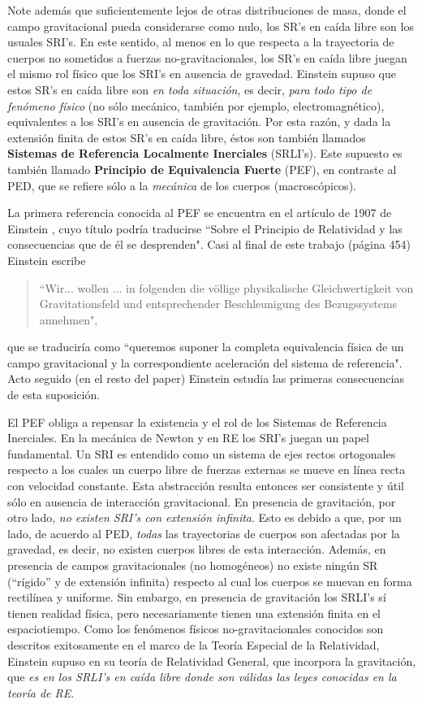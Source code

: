 Note además que suficientemente lejos de otras distribuciones de masa, donde el campo gravitacional pueda considerarse como nulo, los SR's en caída libre son los usuales SRI's. En este sentido, al menos en lo que respecta a la trayectoria de cuerpos no sometidos a fuerzas no-gravitacionales, los SR's en caída libre juegan el mismo rol físico que los SRI's en ausencia de gravedad. Einstein supuso que estos SR's en caída libre son \textit{en toda situación}, es decir, \textit{para todo tipo de fenómeno físico} (no sólo mecánico, también por ejemplo, electromagnético), equivalentes a los SRI's en ausencia de gravitación. Por esta razón, y dada la extensión finita de estos SR's en caída libre, éstos son también llamados \textbf{Sistemas de Referencia Localmente Inerciales} (SRLI's). Este supuesto es también llamado \textbf{Principio de Equivalencia Fuerte} (PEF), en contraste al PED, que se refiere sólo a la \emph{mecánica} de los cuerpos (macroscópicos).

La primera referencia conocida al PEF se encuentra en el artículo de 1907 de Einstein \cite{Einstein07}, cuyo título podría traducirse ``Sobre el Principio de Relatividad y las consecuencias que de él se desprenden".
 Casi al final de este trabajo (página 454) Einstein escribe 
\begin{quotation}
``Wir... wollen ... in folgenden die v\"ollige physikalische Gleichwertigkeit von Gravitationsfeld und entsprechender Beschleunigung des Bezugssystems annehmen",
\end{quotation}
que se traduciría como ``queremos suponer la completa equivalencia física de un campo gravitacional y la correspondiente aceleración del sistema de referencia". Acto seguido (en el resto del paper) Einstein estudia las primeras consecuencias de esta suposición.
 
El PEF obliga a repensar la existencia y el rol de los Sistemas de Referencia Inerciales. En la mecánica de Newton y en RE los SRI's juegan un papel fundamental. Un SRI es entendido como un sistema de ejes rectos ortogonales respecto a los cuales un cuerpo libre de fuerzas externas se mueve en línea recta con velocidad constante. Esta abstracción resulta entonces ser consistente y útil sólo en ausencia de interacción gravitacional. En presencia de gravitación, por otro lado, \textit{no existen SRI's con extensión infinita}. Esto es debido a que, por un lado, de acuerdo al PED, \textit{todas} las trayectorias de cuerpos son afectadas por la gravedad, es decir, no existen cuerpos libres de esta interacción. Además, en presencia de campos gravitacionales (no homogéneos) no existe ningún SR (``rígido'' y de extensión infinita) respecto al cual los cuerpos se muevan en forma rectilínea y uniforme.
Sin embargo, en presencia de gravitación los SRLI's sí tienen realidad física, pero necesariamente tienen una extensión finita en el espaciotiempo.
Como los fenómenos físicos no-gravitacionales conocidos son descritos exitosamente en el marco de la Teoría Especial de la Relatividad, Einstein supuso en su teoría de Relatividad General, que incorpora la gravitación, que \textit{es en los SRLI's en caída libre donde son válidas las leyes conocidas en la teoría de RE}.

